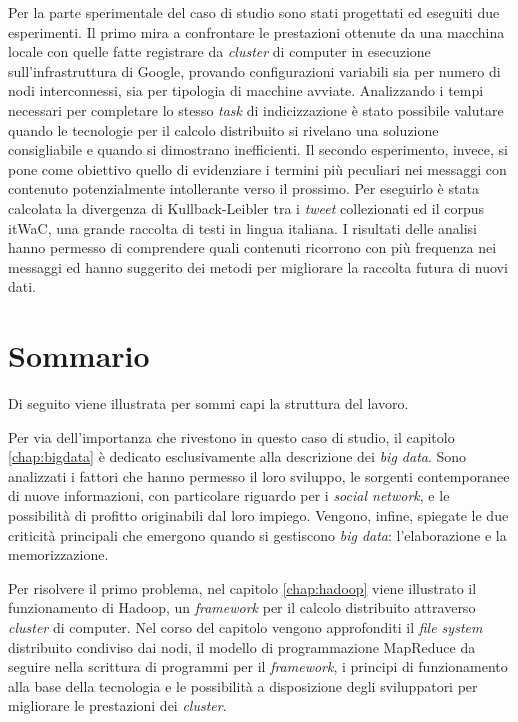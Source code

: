 Per la parte sperimentale del caso di studio sono stati progettati ed eseguiti due esperimenti. Il primo mira a confrontare le prestazioni ottenute da una macchina locale con quelle 
fatte registrare da \textit{cluster} di computer in esecuzione sull'infrastruttura di Google, provando configurazioni variabili sia per numero di nodi interconnessi, sia per tipologia di macchine avviate.
Analizzando i tempi necessari per completare lo stesso \textit{task} di indicizzazione è stato possibile valutare quando le tecnologie per il calcolo distribuito si rivelano una soluzione consigliabile e quando si 
dimostrano inefficienti. Il secondo esperimento, invece, si pone come obiettivo quello di evidenziare i termini più peculiari nei messaggi con contenuto potenzialmente intollerante verso il prossimo.
Per eseguirlo è stata calcolata la divergenza di Kullback-Leibler tra i \textit{tweet} collezionati ed il corpus itWaC, una grande raccolta di testi in lingua italiana. I risultati delle analisi hanno 
permesso di comprendere quali contenuti ricorrono con più frequenza nei messaggi ed hanno suggerito dei metodi per migliorare la raccolta futura di nuovi dati.

\chapter*{Sommario}

Di seguito viene illustrata per sommi capi la struttura del lavoro.

Per via dell'importanza che rivestono in questo caso di studio, il capitolo \ref{chap:bigdata} è dedicato esclusivamente alla descrizione dei \textit{big data}. Sono analizzati i fattori 
che hanno permesso il loro sviluppo, le sorgenti contemporanee di nuove informazioni, con particolare riguardo per i \textit{social network}, e le possibilità di profitto originabili dal loro impiego. Vengono, infine, spiegate le due criticità principali che emergono quando si gestiscono \textit{big data}: l’elaborazione 
e la memorizzazione.

Per risolvere il primo problema, nel capitolo \ref{chap:hadoop} viene illustrato il funzionamento di Hadoop, un \textit{framework} per il calcolo distribuito attraverso \textit{cluster} di computer.
Nel corso del capitolo vengono approfonditi il \textit{file system} distribuito condiviso dai nodi, il modello di programmazione MapReduce da seguire nella 
scrittura di programmi per il \textit{framework}, i principi di funzionamento alla base della tecnologia e le possibilità a disposizione degli sviluppatori per migliorare le prestazioni dei \textit{cluster}.

